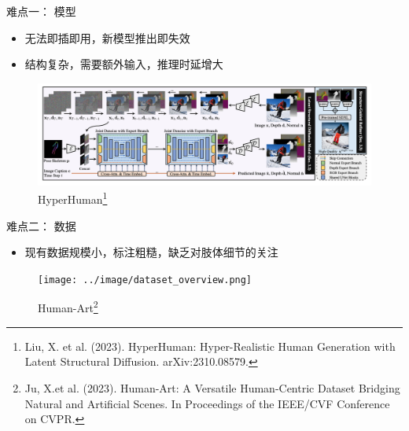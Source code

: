 \documentclass[
    fontset=fandol,
    xcolor=svgnames %
]{ctexbeamer}
\begin{document}
            
\begin{frame}

    \begin{block}{难点一： 模型}
        \begin{itemize}
            \item 无法即插即用，新模型推出即失效
            \item 结构复杂，需要额外输入，推理时延增大
        \end{itemize}
    \end{block}

    \begin{figure}
   \includegraphics[height=0.4\textheight]{../image/hyperhuman.png}
            \caption{HyperHuman\footnote{
Liu, X. et al. (2023). HyperHuman: Hyper-Realistic Human Generation with Latent Structural Diffusion. arXiv:2310.08579.
}}
            \end{figure}
    

\end{frame}



\begin{frame}

    \begin{block}{难点二： 数据}
        \begin{itemize}
            \item 现有数据规模小，标注粗糙，缺乏对肢体细节的关注
        \end{itemize}
    \end{block}

    \begin{figure}
   \texttt{[image: ../image/dataset\_overview.png]}
            \caption{Human-Art\footnote{
Ju, X.et al. (2023). Human-Art: A Versatile Human-Centric Dataset Bridging Natural and Artificial Scenes. In Proceedings of the IEEE/CVF Conference on CVPR.}}
            \end{figure}
    

\end{frame}

\end{document}

